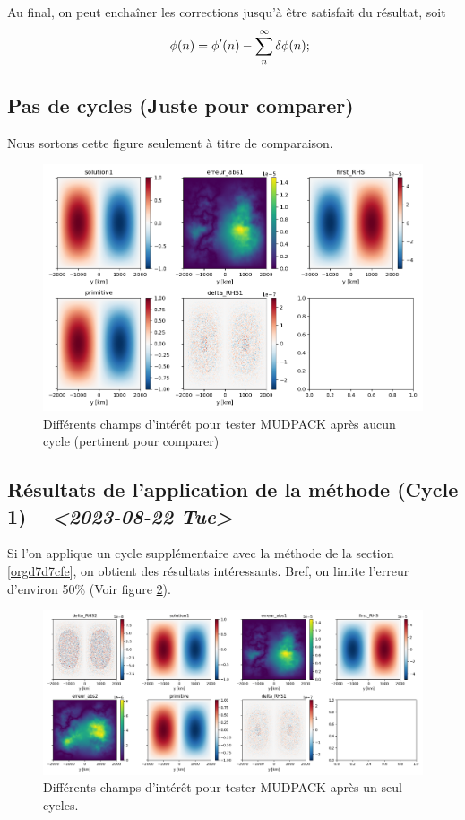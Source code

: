 \documentclass[10pt]{article}
\numberwithin{equation}{section}
\begin{document}
Au final, on peut enchaîner les corrections jusqu'à être satisfait du résultat, soit
\begin{align}
   &\hspace{4mm}\phi(n) = \phi'(n) - \sum_n^\infty \delta\phi(n); \\
\end{align}

\subsection{Pas de cycles (Juste pour comparer)}
\label{sec:orgc74efa6}

Nous sortons cette figure seulement à titre de comparaison.

\begin{figure}[htbp]
\centering
\includegraphics[width=.9\linewidth]{figures/MUDPACK/2023-08-23_MUDPACK_test_dirichlet0.png}
\caption{\label{fig:org52f8971}Différents champs d'intérêt pour tester MUDPACK après aucun cycle (pertinent pour comparer)}
\end{figure}


\subsection{Résultats de l'application de la méthode (Cycle 1) -- \textit{<2023-08-22 Tue>}}
\label{sec:org2564d53}
Si l'on applique un cycle supplémentaire avec la méthode de la section \ref{orgd7d7cfe}, on obtient des résultats intéressants.
Bref, on limite l'erreur d'environ 50\% (Voir figure \ref{fig:orgfc37f12}).

\begin{figure}[htbp]
\centering
\includegraphics[width=.9\linewidth]{figures/MUDPACK/2023-08-23_MUDPACK_test_dirichlet2.png}
\caption{\label{fig:orgfc37f12}Différents champs d'intérêt pour tester MUDPACK après un seul cycles.}
\end{figure}
\end{document}
